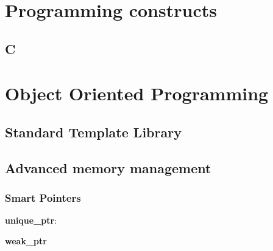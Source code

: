 \documentclass[a4paper,10pt]{book}
\begin{document}
	
	\chapter{Programming constructs}
	\section{C}
	
	\chapter{Object Oriented Programming}
	
	\section{Standard Template Library}
	
	\subsection{}
	
	\section{Advanced memory management}
		\subsection{Smart Pointers}
		
		\textbf{unique_ptr}:
		
		\textbf{weak_ptr}
		
		\textbf{}
\end{document}
